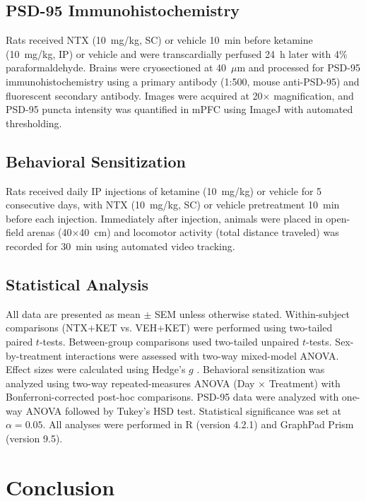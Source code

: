 \documentclass[11pt]{article}
\begin{document}
\subsection{PSD-95 Immunohistochemistry}

Rats received NTX (10~mg/kg, SC) or vehicle 10~min before ketamine (10~mg/kg, IP) or vehicle and were transcardially perfused 24~h later with 4\% paraformaldehyde. Brains were cryosectioned at 40~$\mu$m and processed for PSD-95 immunohistochemistry using a primary antibody (1:500, mouse anti-PSD-95) and fluorescent secondary antibody. Images were acquired at 20$\times$ magnification, and PSD-95 puncta intensity was quantified in mPFC using ImageJ with automated thresholding.

\subsection{Behavioral Sensitization}

Rats received daily IP injections of ketamine (10~mg/kg) or vehicle for 5 consecutive days, with NTX (10~mg/kg, SC) or vehicle pretreatment 10~min before each injection. Immediately after injection, animals were placed in open-field arenas (40$\times$40~cm) and locomotor activity (total distance traveled) was recorded for 30~min using automated video tracking.

\subsection{Statistical Analysis}

All data are presented as mean $\pm$ SEM unless otherwise stated. Within-subject comparisons (NTX+KET vs. VEH+KET) were performed using two-tailed paired $t$-tests. Between-group comparisons used two-tailed unpaired $t$-tests. Sex-by-treatment interactions were assessed with two-way mixed-model ANOVA. Effect sizes were calculated using Hedge's $g$ \citep{hedges1981distribution}. Behavioral sensitization was analyzed using two-way repeated-measures ANOVA (Day $\times$ Treatment) with Bonferroni-corrected post-hoc comparisons. PSD-95 data were analyzed with one-way ANOVA followed by Tukey's HSD test. Statistical significance was set at $\alpha = 0.05$. All analyses were performed in R (version 4.2.1) and GraphPad Prism (version 9.5).

\section{Conclusion}
\end{document}
